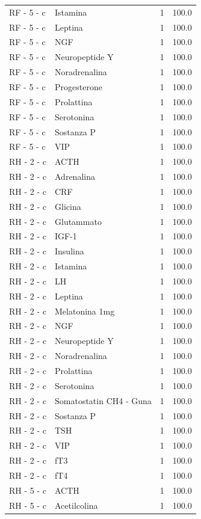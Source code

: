 \documentclass[a4paper,11pt]{article}
\begin{document}
\begin{footnotesize}
\begin{longtable}{p{3.5cm}p{7.5cm}rr}
RF - 5 - c & Istamina & 1 & 100.0 \\
RF - 5 - c & Leptina & 1 & 100.0 \\
RF - 5 - c & NGF & 1 & 100.0 \\
RF - 5 - c & Neuropeptide Y & 1 & 100.0 \\
RF - 5 - c & Noradrenalina & 1 & 100.0 \\
RF - 5 - c & Progesterone & 1 & 100.0 \\
RF - 5 - c & Prolattina & 1 & 100.0 \\
RF - 5 - c & Serotonina & 1 & 100.0 \\
RF - 5 - c & Sostanza P & 1 & 100.0 \\
RF - 5 - c & VIP & 1 & 100.0 \\
RH - 2 - c & ACTH & 1 & 100.0 \\
RH - 2 - c & Adrenalina & 1 & 100.0 \\
RH - 2 - c & CRF & 1 & 100.0 \\
RH - 2 - c & Glicina & 1 & 100.0 \\
RH - 2 - c & Glutammato & 1 & 100.0 \\
RH - 2 - c & IGF-1 & 1 & 100.0 \\
RH - 2 - c & Insulina & 1 & 100.0 \\
RH - 2 - c & Istamina & 1 & 100.0 \\
RH - 2 - c & LH & 1 & 100.0 \\
RH - 2 - c & Leptina & 1 & 100.0 \\
RH - 2 - c & Melatonina 1mg & 1 & 100.0 \\
RH - 2 - c & NGF & 1 & 100.0 \\
RH - 2 - c & Neuropeptide Y & 1 & 100.0 \\
RH - 2 - c & Noradrenalina & 1 & 100.0 \\
RH - 2 - c & Prolattina & 1 & 100.0 \\
RH - 2 - c & Serotonina & 1 & 100.0 \\
RH - 2 - c & Somatostatin CH4 - Guna & 1 & 100.0 \\
RH - 2 - c & Sostanza P & 1 & 100.0 \\
RH - 2 - c & TSH & 1 & 100.0 \\
RH - 2 - c & VIP & 1 & 100.0 \\
RH - 2 - c & fT3 & 1 & 100.0 \\
RH - 2 - c & fT4 & 1 & 100.0 \\
RH - 5 - c & ACTH & 1 & 100.0 \\
RH - 5 - c & Acetilcolina & 1 & 100.0 \\

\end{longtable}
\end{footnotesize}
\end{document}
